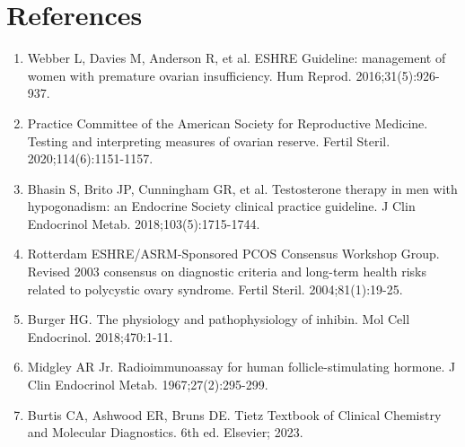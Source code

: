 \section*{References}
\begin{enumerate}
  \item Webber L, Davies M, Anderson R, et al. ESHRE Guideline: management of women with premature ovarian insufficiency. Hum Reprod. 2016;31(5):926-937.
  \item Practice Committee of the American Society for Reproductive Medicine. Testing and interpreting measures of ovarian reserve. Fertil Steril. 2020;114(6):1151-1157.
  \item Bhasin S, Brito JP, Cunningham GR, et al. Testosterone therapy in men with hypogonadism: an Endocrine Society clinical practice guideline. J Clin Endocrinol Metab. 2018;103(5):1715-1744.
  \item Rotterdam ESHRE/ASRM-Sponsored PCOS Consensus Workshop Group. Revised 2003 consensus on diagnostic criteria and long-term health risks related to polycystic ovary syndrome. Fertil Steril. 2004;81(1):19-25.
  \item Burger HG. The physiology and pathophysiology of inhibin. Mol Cell Endocrinol. 2018;470:1-11.
  \item Midgley AR Jr. Radioimmunoassay for human follicle-stimulating hormone. J Clin Endocrinol Metab. 1967;27(2):295-299.
  \item Burtis CA, Ashwood ER, Bruns DE. Tietz Textbook of Clinical Chemistry and Molecular Diagnostics. 6th ed. Elsevier; 2023.
\end{enumerate}

\clearpage

